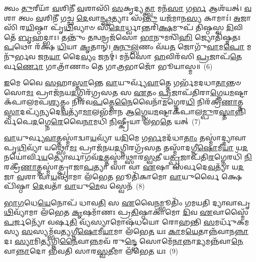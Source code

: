 𑌤𑍍𑌵𑌂 \ul{𑌤𑍁}\-𑌰𑍀𑌯𑌾᳴ \ul{𑌵}\-𑌶𑌿𑌨𑍀᳴ \ul{𑌵}\-𑌶𑌾𑌸𑌿᳴ \ul{𑌸}\-𑌕𑍃𑌦𑍍𑌯\-\ul{𑌤𑍍𑌤𑍍𑌵𑌾} 𑌮𑌨᳴\-\ul{𑌸𑌾} 𑌗\-\ul{𑌰𑍍𑌭} 𑌆𑌶᳴𑌯𑌤𑍍। \ul{𑌵}\-𑌶𑌾 𑌤𑍍𑌵𑌂 \ul{𑌵}\-𑌶𑌿𑌨𑍀᳴ 𑌗𑌚𑍍𑌛 \ul{𑌦𑍇}\-𑌵𑌾\-\ul{𑌨𑍍𑌥𑍍𑌸}\-𑌤𑍍𑌯𑌾𑌃 𑌸᳴\-\ul{𑌨𑍍𑌤𑍁} 𑌯𑌜᳴𑌮𑌾𑌨\-\ul{𑌸𑍍𑌯} 𑌕𑌾𑌮𑌾𑌃॑। \ul{𑌅}\-𑌜𑌾𑌸𑌿᳴ 𑌰\-\ul{𑌯𑌿}\-𑌷𑍍𑌠𑌾 𑌪𑍃᳴\-\ul{𑌥𑌿}\-𑌵𑍍𑌯𑌾𑍞 𑌸𑍀᳴\-\ul{𑌦𑍋}\-𑌰𑍍𑌧𑍍𑌵𑌾𑌨𑍍𑌤𑌰𑌿᳴\-\ul{𑌕𑍍𑌷}\-𑌮𑍁𑌪᳴ 𑌤𑌿𑌷𑍍𑌠𑌸𑍍𑌵 \ul{𑌦𑌿}\-𑌵𑌿 𑌤𑍇᳴ \ul{𑌬𑍃}\-𑌹𑌦𑍍𑌭𑌾𑌃। 𑌤𑌨𑍍𑌤𑍁𑌂᳴ \ul{𑌤}\-𑌨𑍍𑌵𑌨𑍍𑌰𑌜᳴𑌸𑍋 \ul{𑌭𑌾}\-𑌨𑍁𑌮𑌨𑍍𑌵𑌿᳴\-\ul{𑌹𑌿} 𑌜𑍍𑌯𑍋𑌤𑌿᳴𑌷𑍍𑌮𑌤𑌃 \ul{𑌪}\-𑌥𑍋 𑌰᳴𑌕𑍍𑌷 \ul{𑌧𑌿}\-𑌯𑌾 \ul{𑌕𑍃}\-𑌤𑌾𑌨𑍍। \ul{𑌅}\-\-\ul{𑌨𑍁}\-\-\ul{𑌲𑍍𑌬}\-𑌣𑌂 𑌵᳴𑌯\-\ul{𑌤} 𑌜𑍋𑌗𑍁᳴\-\ul{𑌵𑌾}\-𑌮\-\ul{𑌪𑍋} 𑌮𑌨𑍁᳴𑌰𑍍𑌭𑌵 \ul{𑌜}\-𑌨\-\ul{𑌯𑌾} 𑌦𑍈\-\ul{𑌵𑍍𑌯𑌂} 𑌜𑌨𑌮𑍍॑। 𑌮𑌨᳴𑌸𑍋 \ul{𑌹}\-𑌵𑌿𑌰᳴𑌸𑌿 \ul{𑌪𑍍𑌰}\-𑌜𑌾𑌪᳴\-\ul{𑌤𑍇}\-𑌰𑍍𑌵\-\ul{𑌰𑍍𑌣𑍋} 𑌗𑌾𑌤𑍍𑌰𑌾᳴𑌣𑌾𑌂 𑌤𑍇 𑌗𑌾\-\ul{𑌤𑍍𑌰}\-𑌭𑌾𑌜𑍋᳴ 𑌭𑍂𑌯𑌾𑌸𑍍𑌮॥~(6)

{\anuvakamend[{𑌸𑌰᳴𑌸𑍍𑌵\-\ul{𑌤𑍍𑌯𑍈} 𑌸𑍍𑌵𑌾\-\ul{𑌹𑌾} 𑌮\-\ul{𑌨𑍁}\-𑌸𑍍𑌤𑍍𑌰𑌯𑍋᳴𑌦𑌶 𑌚}]}%

\-\ul{𑌇}\-𑌮𑍇 𑌵𑍈 \ul{𑌸}\-𑌹𑌾\-\ul{𑌸𑍍𑌤𑌾}\-𑌨𑍍𑌤𑍇 \ul{𑌵𑌾}\-𑌯𑍁𑌰𑍍𑌵𑍍𑌯᳴\-\ul{𑌵𑌾}\-𑌤𑍍𑌤𑍇 𑌗𑌰𑍍𑌭᳴𑌮𑌦𑌧𑌾\-\ul{𑌤𑌾}\-𑌨𑍍𑌤𑍞 𑌸𑍋\-\ul{𑌮𑌃} 𑌪𑍍𑌰𑌾𑌜᳴𑌨𑌯\-\ul{𑌦}\-𑌗𑍍𑌨𑌿𑌰᳴𑌗𑍍𑌰𑌸\-\ul{𑌤} 𑌸 \ul{𑌏}\-𑌤𑌂 \ul{𑌪𑍍𑌰}\-𑌜𑌾𑌪᳴𑌤𑌿𑌰𑌾\-\ul{𑌗𑍍𑌨𑍇}\-𑌯\-\ul{𑌮}\-𑌷𑍍𑌟𑌾𑌕᳴𑌪𑌾𑌲\-𑌮𑌪\-\ul{𑌶𑍍𑌯}\-𑌤𑍍𑌤𑌂 𑌨𑌿𑌰᳴𑌵\-\ul{𑌪}\-𑌤𑍍𑌤𑍇\-\ul{𑌨𑍈}\-𑌵𑍈𑌨𑌾᳴\-\ul{𑌮}\-𑌗𑍍𑌨𑍇𑌰\-\ul{𑌧𑌿} 𑌨𑌿𑌰᳴𑌕𑍍𑌰𑍀\-\ul{𑌣𑌾}\-𑌤𑍍𑌤\-\ul{𑌸𑍍𑌮𑌾}\-𑌦𑌪𑍍𑌯᳴𑌨𑍍𑌯𑌦𑍇\-\ul{𑌵}\-𑌤𑍍𑌯𑌾᳴\-\ul{𑌮𑌾}\-𑌲𑌭᳴𑌮𑌾𑌨 𑌆\-\ul{𑌗𑍍𑌨𑍇}\-𑌯\-\ul{𑌮}\-𑌷𑍍𑌟𑌾𑌕᳴𑌪𑌾𑌲\-\ul{𑌮𑍍𑌪𑍁}\-𑌰\-\ul{𑌸𑍍𑌤𑌾}\-𑌨𑍍𑌨𑌿𑌰𑍍𑌵᳴𑌪𑍇\-\ul{𑌦}\-𑌗𑍍𑌨𑍇\-\-\ul{𑌰𑍇}\-𑌵𑍈\-\ul{𑌨𑌾}\-𑌮𑌧𑌿᳴ \ul{𑌨𑌿}\-𑌷𑍍𑌕𑍍𑌰𑍀𑌯𑌾 𑌲᳴𑌭\-\ul{𑌤𑍇} 𑌯𑌤𑍍~(7)

\-\ul{𑌵𑌾}\-𑌯𑍁𑌰𑍍𑌵𑍍𑌯\-\ul{𑌵𑌾}\-𑌤𑍍𑌤𑌸𑍍𑌮𑌾॑𑌦𑍍𑌵𑌾\-\ul{𑌯}\-𑌵𑍍𑌯𑌾᳴ 𑌯\-\ul{𑌦𑌿}\-𑌮𑍇 𑌗\-\ul{𑌰𑍍𑌭}\-𑌮𑌦᳴𑌧𑌾\-\ul{𑌤𑌾𑌂} 𑌤𑌸𑍍𑌮𑌾॑𑌦𑍍𑌦𑍍𑌯𑌾𑌵𑌾𑌪𑍃\-\ul{𑌥𑌿}\-𑌵𑍍𑌯𑌾᳴ 𑌯𑌥𑍍𑌸𑍋\-\ul{𑌮𑌃} 𑌪𑍍𑌰𑌾𑌜᳴𑌨𑌯\-\ul{𑌦}\-𑌗𑍍𑌨𑌿𑌰𑌗𑍍𑌰᳴𑌸\-\ul{𑌤} 𑌤𑌸𑍍𑌮𑌾᳴𑌦𑌗𑍍𑌨𑍀\-\ul{𑌷𑍋}\-𑌮𑍀\-\ul{𑌯𑌾} 𑌯\-\ul{𑌦}\-𑌨𑌯𑍋॑𑌰𑍍𑌵𑌿\-\ul{𑌯}\-𑌤𑍍𑌯𑍋𑌰𑍍𑌵𑌾𑌗𑌵᳴\-\ul{𑌦}\-𑌤𑍍𑌤𑌸𑍍𑌮𑌾॑𑌥𑍍𑌸𑌾𑌰\-\ul{𑌸𑍍𑌵}\-𑌤𑍀 𑌯\-\ul{𑌤𑍍𑌪𑍍𑌰}\-𑌜𑌾𑌪᳴𑌤𑌿\-\ul{𑌰}\-𑌗𑍍𑌨𑍇𑌰𑌧𑌿᳴ \ul{𑌨𑌿}\-𑌰𑌕𑍍𑌰𑍀᳴\-\ul{𑌣𑌾}\-𑌤𑍍𑌤𑌸𑍍𑌮𑌾॑𑌤𑍍𑌪𑍍𑌰𑌾𑌜𑌾\-\ul{𑌪}\-𑌤𑍍𑌯𑌾 𑌸𑌾 𑌵𑌾 \ul{𑌏}\-𑌷𑌾 𑌸᳴𑌰𑍍𑌵𑌦𑍇\-\ul{𑌵}\-𑌤𑍍𑌯𑌾᳴ 𑌯\-\ul{𑌦}\-𑌜𑌾 \ul{𑌵}\-𑌶𑌾 𑌵𑌾᳴\-\ul{𑌯}\-𑌵𑍍𑌯𑌾᳴𑌮𑌾 𑌲᳴𑌭𑍇\-\ul{𑌤} 𑌭𑍂𑌤𑌿᳴𑌕𑌾𑌮𑍋 \ul{𑌵𑌾}\-𑌯𑍁𑌰𑍍𑌵𑍈 𑌕𑍍𑌷𑍇𑌪𑌿᳴𑌷𑍍𑌠𑌾 \ul{𑌦𑍇}\-𑌵𑌤𑌾᳴ \ul{𑌵𑌾}\-𑌯𑍁\-\ul{𑌮𑍇}\-𑌵 𑌸𑍍𑌵𑍇𑌨᳴~(8)

\-\ul{𑌭𑌾}\-\-\ul{𑌗}\-𑌧𑍇\-\ul{𑌯𑍇}\-𑌨𑍋𑌪᳴ 𑌧𑌾𑌵\-\ul{𑌤𑌿} 𑌸 \ul{𑌏}\-𑌵𑍈\-\ul{𑌨}\-𑌮𑍍𑌭𑍂𑌤𑌿𑌂᳴ 𑌗𑌮𑌯𑌤𑌿 𑌦𑍍𑌯𑌾𑌵𑌾𑌪𑍃\-\ul{𑌥𑌿}\-𑌵𑍍𑌯𑌾᳴𑌮𑌾 𑌲᳴𑌭𑍇𑌤 \ul{𑌕𑍃}\-𑌷𑌮𑌾᳴𑌣𑌃 𑌪𑍍𑌰\-\ul{𑌤𑌿}\-𑌷𑍍𑌠𑌾𑌕𑌾᳴𑌮𑍋 \ul{𑌦𑌿}\-𑌵 \ul{𑌏}\-𑌵𑌾𑌸𑍍𑌮𑍈᳴ \ul{𑌪}\-𑌰𑍍𑌜𑌨𑍍𑌯𑍋᳴ 𑌵𑌰𑍍\mbox{}𑌷\-\ul{𑌤𑌿} 𑌵𑍍𑌯᳴𑌸𑍍𑌯𑌾𑌮𑍋𑌷᳴𑌧𑌯𑍋 𑌰𑍋𑌹𑌨𑍍𑌤𑌿 \ul{𑌸}\-𑌮𑌰𑍍𑌧𑍁᳴𑌕𑌮𑌸𑍍𑌯 \ul{𑌸}\-𑌸𑍍𑌯𑌮𑍍𑌭᳴𑌵𑌤𑍍𑌯𑌗𑍍𑌨𑍀\-\ul{𑌷𑍋}\-𑌮𑍀\-\ul{𑌯𑌾}\-𑌮𑌾 𑌲᳴𑌭𑍇\-\ul{𑌤} 𑌯𑌃 \ul{𑌕𑌾}\-𑌮\-\ul{𑌯𑍇}\-𑌤𑌾𑌨𑍍𑌨᳴𑌵𑌾𑌨\-\ul{𑌨𑍍𑌨𑌾}\-𑌦𑌃 \ul{𑌸𑍍𑌯𑌾}\-𑌮𑌿\-\ul{𑌤𑍍𑌯}\-𑌗𑍍𑌨𑌿\-\ul{𑌨𑍈}\-𑌵𑌾\-\ul{𑌨𑍍𑌨}\-𑌮𑌵᳴ 𑌰𑍁\-\ul{𑌨𑍍𑌦𑍍𑌧𑍇} 𑌸𑍋𑌮𑍇᳴\-\ul{𑌨𑌾}\-𑌨𑍍𑌨𑌾\-\ul{𑌦𑍍𑌯}\-𑌮𑌨𑍍𑌨᳴𑌵𑌾\-\ul{𑌨𑍇}\-𑌵𑌾\-\ul{𑌨𑍍𑌨𑌾}\-𑌦𑍋 𑌭᳴𑌵𑌤𑌿 𑌸𑌾𑌰\-\ul{𑌸𑍍𑌵}\-𑌤𑍀𑌮𑌾 𑌲᳴𑌭𑍇\-\ul{𑌤} 𑌯𑌃~(9)

